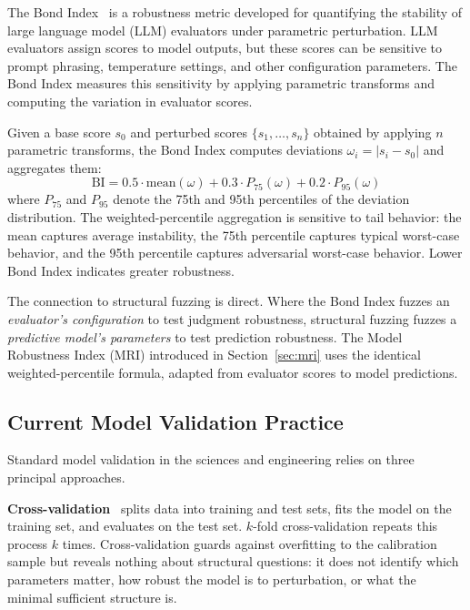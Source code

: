 \documentclass[manuscript,review,anonymous]{acmart}
\newcommand{\BI}{\mathrm{BI}}
\begin{document}
The Bond Index~\cite{bond2026} is a robustness metric developed for quantifying the stability of large language model (LLM) evaluators under parametric perturbation.
LLM evaluators assign scores to model outputs, but these scores can be sensitive to prompt phrasing, temperature settings, and other configuration parameters.
The Bond Index measures this sensitivity by applying parametric transforms and computing the variation in evaluator scores.

Given a base score $s_0$ and perturbed scores $\{s_1, \ldots, s_n\}$ obtained by applying $n$ parametric transforms, the Bond Index computes deviations $\omega_i = |s_i - s_0|$ and aggregates them:
\begin{equation}
    \BI = 0.5 \cdot \mathrm{mean}(\omega) + 0.3 \cdot P_{75}(\omega) + 0.2 \cdot P_{95}(\omega)
    \label{eq:bond_index}
\end{equation}
where $P_{75}$ and $P_{95}$ denote the 75th and 95th percentiles of the deviation distribution.
The weighted-percentile aggregation is sensitive to tail behavior: the mean captures average instability, the 75th percentile captures typical worst-case behavior, and the 95th percentile captures adversarial worst-case behavior.
Lower Bond Index indicates greater robustness.

The connection to structural fuzzing is direct.
Where the Bond Index fuzzes an \emph{evaluator's configuration} to test judgment robustness, structural fuzzing fuzzes a \emph{predictive model's parameters} to test prediction robustness.
The Model Robustness Index (MRI) introduced in Section~\ref{sec:mri} uses the identical weighted-percentile formula, adapted from evaluator scores to model predictions.

\subsection{Current Model Validation Practice}

Standard model validation in the sciences and engineering relies on three principal approaches.

\textbf{Cross-validation}~\cite{stone1974} splits data into training and test sets, fits the model on the training set, and evaluates on the test set.
$k$-fold cross-validation repeats this process $k$ times.
Cross-validation guards against overfitting to the calibration sample but reveals nothing about structural questions: it does not identify which parameters matter, how robust the model is to perturbation, or what the minimal sufficient structure is.
\end{document}
